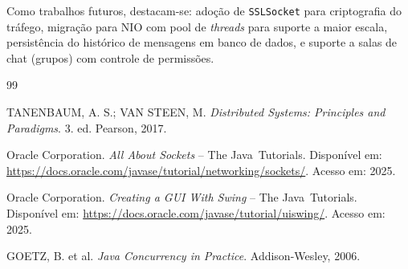 \documentclass[10pt,twocolumn,a4paper]{article}
\begin{document}
Como trabalhos futuros, destacam-se: adoção de \texttt{SSLSocket} para
criptografia do tráfego, migração para NIO com pool de \textit{threads} para
suporte a maior escala, persistência do histórico de mensagens em banco de
dados, e suporte a salas de chat (grupos) com controle de permissões.


\begin{thebibliography}{99}

TANENBAUM, A. S.; VAN STEEN, M.
\textit{Distributed Systems: Principles and Paradigms}. 3. ed.
Pearson, 2017.

Oracle Corporation.
\textit{All About Sockets} -- The Java\texttrademark\ Tutorials.
Disponível em: \url{https://docs.oracle.com/javase/tutorial/networking/sockets/}.
Acesso em: 2025.

Oracle Corporation.
\textit{Creating a GUI With Swing} -- The Java\texttrademark\ Tutorials.
Disponível em: \url{https://docs.oracle.com/javase/tutorial/uiswing/}.
Acesso em: 2025.

GOETZ, B. et al.
\textit{Java Concurrency in Practice}. Addison-Wesley, 2006.

\end{thebibliography}
\end{document}
